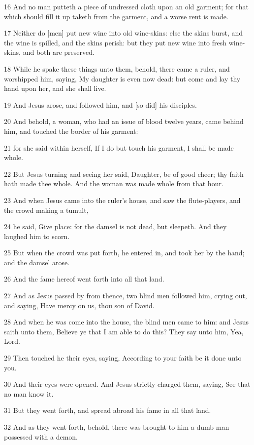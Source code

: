 \par 16 And no man putteth a piece of undressed cloth upon an old garment; for that which should fill it up taketh from the garment, and a worse rent is made.
\par 17 Neither do [men] put new wine into old wine-skins: else the skins burst, and the wine is spilled, and the skins perish: but they put new wine into fresh wine-skins, and both are preserved.
\par 18 While he spake these things unto them, behold, there came a ruler, and worshipped him, saying, My daughter is even now dead: but come and lay thy hand upon her, and she shall live.
\par 19 And Jesus arose, and followed him, and [so did] his disciples.
\par 20 And behold, a woman, who had an issue of blood twelve years, came behind him, and touched the border of his garment:
\par 21 for she said within herself, If I do but touch his garment, I shall be made whole.
\par 22 But Jesus turning and seeing her said, Daughter, be of good cheer; thy faith hath made thee whole. And the woman was made whole from that hour.
\par 23 And when Jesus came into the ruler's house, and saw the flute-players, and the crowd making a tumult,
\par 24 he said, Give place: for the damsel is not dead, but sleepeth. And they laughed him to scorn.
\par 25 But when the crowd was put forth, he entered in, and took her by the hand; and the damsel arose.
\par 26 And the fame hereof went forth into all that land.
\par 27 And as Jesus passed by from thence, two blind men followed him, crying out, and saying, Have mercy on us, thou son of David.
\par 28 And when he was come into the house, the blind men came to him: and Jesus saith unto them, Believe ye that I am able to do this? They say unto him, Yea, Lord.
\par 29 Then touched he their eyes, saying, According to your faith be it done unto you.
\par 30 And their eyes were opened. And Jesus strictly charged them, saying, See that no man know it.
\par 31 But they went forth, and spread abroad his fame in all that land.
\par 32 And as they went forth, behold, there was brought to him a dumb man possessed with a demon.
